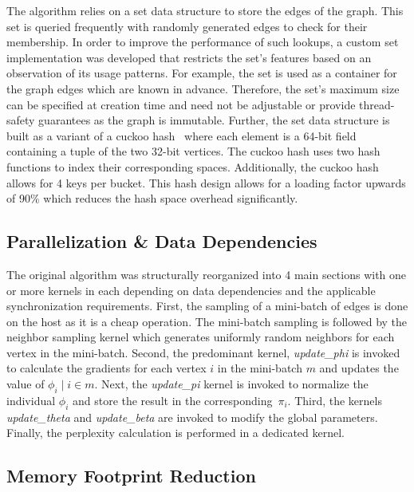The algorithm relies on a set data structure to store the edges of the graph.
This set is queried frequently with randomly generated edges to check for their
membership. In order to improve the performance of such lookups, a custom set
implementation was developed that restricts the set's features based on an
observation of its usage patterns. For example, the set is used as a container
for the graph edges which are known in advance. Therefore, the set's maximum
size can be specified at creation time and need not be adjustable or provide
thread-safety guarantees as the graph is immutable. Further, the set data
structure is built as a variant of a cuckoo
hash~\cite{Pagh:2004:CH:1006424.1006426} where each element is a 64-bit
field containing a tuple of the two 32-bit vertices. The cuckoo hash
uses two hash functions to index their corresponding spaces. Additionally, the
cuckoo hash allows for 4 keys per bucket. This hash design allows for a loading
factor upwards of 90\% which reduces the hash space overhead
significantly.

\subsection*{Parallelization \& Data Dependencies}
The original algorithm was structurally reorganized into 4 main sections with
one or more kernels in each depending on data dependencies and the applicable
synchronization requirements.
%
First, the sampling of a mini-batch of edges is done on the host as it is a
cheap operation. The mini-batch sampling is followed by the neighbor sampling
kernel which generates uniformly random neighbors for each vertex in the
mini-batch. 
%
Second, the predominant kernel, \textit{update\_phi} is invoked to calculate the
gradients for each vertex $i$ in the mini-batch $m$ and updates the value of $ \phi_i
\mid i \in m$. Next, the \textit{update\_pi} kernel is invoked to normalize the
individual $\phi_i$ and store the result in the corresponding~$\pi_i$.
%
Third, the kernels \textit{update\_theta} and \textit{update\_beta} are invoked to modify the
global parameters.
%
Finally, the perplexity calculation is performed in a dedicated kernel.

\subsection*{Memory Footprint Reduction}

